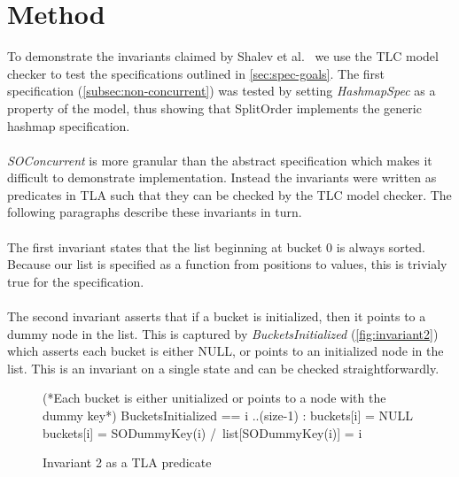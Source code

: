 \documentclass{uit-thesis}
\begin{document}
\section{Method}
To demonstrate the invariants claimed by Shalev et al.~\cite{Shalev2006} we use the TLC model checker to test the specifications outlined in \autoref{sec:spec-goals}. The first specification (\autoref{subsec:non-concurrent}) was tested by setting \textit{HashmapSpec} as a property of the model, thus showing that SplitOrder implements the generic hashmap specification.
\\\\
\textit{SOConcurrent} is more granular than the abstract specification which makes it difficult to demonstrate implementation. Instead the invariants were written as predicates in TLA such that they can be checked by the TLC model checker. The following paragraphs describe these invariants in turn.
\\\\
The first invariant states that the list beginning at bucket 0 is always sorted. Because our list is specified as a function from positions to values, this is trivialy true for the specification.
\\\\
The second invariant asserts that if a bucket is initialized, then it points to a dummy node in the list. This is captured by \textit{BucketsInitialized} (\autoref{fig:invariant2}) which asserts each bucket is either NULL, or points to an initialized node in the list. This is an invariant on a single state and can be checked straightforwardly.
\begin{figure}[h]
    \begin{tla}
        (*Each bucket is either unitialized or points to a node with the dummy key*)
        BucketsInitialized ==
            \A i ..(size-1) :
                \/ buckets[i] = NULL
                \/ buckets[i] = SODummyKey(i) /\ list[SODummyKey(i)] = i
    \end{tla}
\begin{tlatex}
%
%
\@xx{}%
%
%
%
\end{tlatex}
    \caption{Invariant 2 as a TLA predicate}
    \label{fig:invariant2}
\end{figure}
\end{document}
